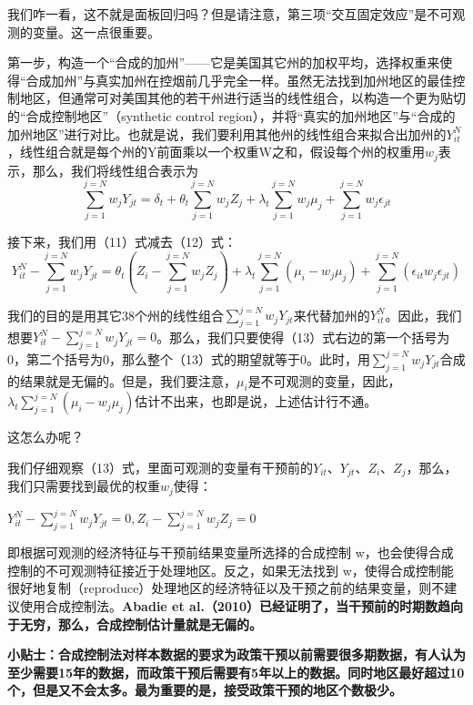\documentclass[cn,12pt,math=newtx,citestyle=gb7714-2015,bibstyle=gb7714-2015]{elegantbook}
\begin{document}
	我们咋一看，这不就是面板回归吗？但是请注意，第三项“交互固定效应”是不可观测的变量。这一点很重要。
	
	第一步，构造一个“合成的加州”——它是美国其它州的加权平均，选择权重来使得“合成加州”与真实加州在控烟前几乎完全一样。虽然无法找到加州地区的最佳控制地区，但通常可对美国其他的若干州进行适当的线性组合，以构造一个更为贴切的“合成控制地区”（synthetic control region），并将“真实的加州地区”与“合成的加州地区”进行对比。也就是说，我们要利用其他州的线性组合来拟合出加州的$Y_{it}^N$，线性组合就是每个州的Y前面乘以一个权重W之和，假设每个州的权重用$w_j$表示，那么，我们将线性组合表示为
	\begin{equation}
		\sum_{j=1}^{j=N}w_jY_{jt}=\delta_t+\theta_t\sum_{j=1}^{j=N}w_jZ_j+\lambda_t\sum_{j=1}^{j=N}w_j\mu_j+\sum_{j=1}^{j=N}w_j\epsilon_{jt}
	\end{equation}
	
	接下来，我们用（11）式减去（12）式：
	\begin{equation}
		Y_{it}^N-\sum_{j=1}^{j=N}w_jY_{jt}=\theta_t(Z_i-\sum_{j=1}^{j=N}w_jZ_j)+\lambda_t\sum_{j=1}^{j=N}(\mu_i-w_j\mu_j)+\sum_{j=1}^{j=N}(\epsilon_{it}w_j\epsilon_{jt})
	\end{equation}
	
	我们的目的是用其它38个州的线性组合$\sum_{j=1}^{j=N}w_jY_{jt}$来代替加州的$Y_{it}^N$。因此，我们想要$Y_{it}^N-\sum_{j=1}^{j=N}w_jY_{jt}=0$。那么，我们只要使得（13）式右边的第一个括号为0，第二个括号为0，那么整个（13）式的期望就等于0。此时，用$\sum_{j=1}^{j=N}w_jY_{jt}$合成的结果就是无偏的。但是，我们要注意，$\mu_i$是不可观测的变量，因此，$\lambda_t\sum_{j=1}^{j=N}(\mu_i-w_j\mu_j)$估计不出来，也即是说，上述估计行不通。
	
	这怎么办呢？
	
	我们仔细观察（13）式，里面可观测的变量有干预前的$Y_{it}$、$Y_{jt}$、$Z_i$、$Z_j$，那么，我们只需要找到最优的权重$w_j$使得：
	\begin{center}
		$Y_{it}^N-\sum_{j=1}^{j=N}w_jY_{jt}=0,Z_i-\sum_{j=1}^{j=N}w_jZ_j=0$
	\end{center}
	
	即根据可观测的经济特征与干预前结果变量所选择的合成控制 w，也会使得合成控制的不可观测特征接近于处理地区。反之，如果无法找到 w，使得合成控制能很好地复制（reproduce）处理地区的经济特征以及干预之前的结果变量，则不建议使用合成控制法。\textbf{Abadie et al.（2010）已经证明了，当干预前的时期数趋向于无穷，那么，合成控制估计量就是无偏的。}
	
	\textbf{小贴士：合成控制法对样本数据的要求为政策干预以前需要很多期数据，有人认为至少需要15年的数据，而政策干预后需要有5年以上的数据。同时地区最好超过10 个，但是又不会太多。最为重要的是，接受政策干预的地区个数极少。}
	
\end{document}
